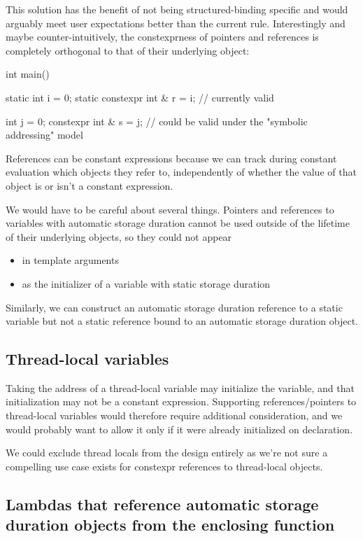 \documentclass{wg21}
\begin{document}
This solution has the benefit of not being structured-binding specific and would arguably meet user expectations better than the current rule.
Interestingly and maybe counter-intuitively, the constexprness of pointers and references is completely orthogonal to that of their underlying object:

\begin{colorblock}
int main() {
    static int i = 0;
    static constexpr int & r = i; // currently valid

    int j = 0;
    constexpr int & s = j; // could be valid under the "symbolic addressing" model
}
\end{colorblock}

References can be constant expressions because we can track during constant evaluation which objects they refer to, independently of whether the value of that object is or isn't a constant expression.

We would have to be careful about several things.
Pointers and references to variables with automatic storage duration cannot be used outside of the lifetime of their underlying objects, so they could not appear
\begin{itemize}
  \item in template arguments
  \item as the initializer of a variable with static storage duration
\end{itemize}

Similarly, we can construct an automatic storage duration  reference to a static variable but not a static  reference bound to an automatic storage duration object.

\subsection{Thread-local variables}

Taking the address of a thread-local variable may initialize the variable, and that initialization may not be a constant expression.
Supporting references/pointers to thread-local variables would therefore require additional consideration, and we would probably want to allow it only if it were  already initialized
on declaration.

We could exclude thread locals from the design entirely as we're not sure a compelling use case exists for constexpr references to thread-local objects.

\subsection{Lambdas that reference automatic storage duration objects from the enclosing function}
\end{document}

